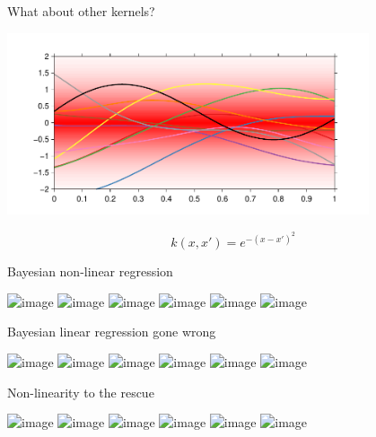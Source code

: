 \begin{frame}{What about other kernels?}
  \begin{center}
    \includegraphics[width=0.8\textwidth]{../figures/lin_reg/sq_exp_prior}
  \end{center}
  \begin{equation*}
    k(x, x') = e^{-(x-x')^2}
  \end{equation*}
\end{frame}

\begin{frame}{Bayesian non-linear regression}
  \begin{center}
    \includegraphics<1>[width=0.8\textwidth]{../figures/lin_reg/sq_exp_1}
    \includegraphics<2>[width=0.8\textwidth]{../figures/lin_reg/sq_exp_2}
    \includegraphics<3>[width=0.8\textwidth]{../figures/lin_reg/sq_exp_3}
    \includegraphics<4>[width=0.8\textwidth]{../figures/lin_reg/sq_exp_5}
    \includegraphics<5>[width=0.8\textwidth]{../figures/lin_reg/sq_exp_10}
    \includegraphics<6>[width=0.8\textwidth]{../figures/lin_reg/sq_exp_15}
  \end{center}
\end{frame}

\begin{frame}{Bayesian linear regression gone wrong}
  \begin{center}
    \includegraphics<1>[width=0.8\textwidth]{../figures/quad/bayes_1}
    \includegraphics<2>[width=0.8\textwidth]{../figures/quad/bayes_2}
    \includegraphics<3>[width=0.8\textwidth]{../figures/quad/bayes_3}
    \includegraphics<4>[width=0.8\textwidth]{../figures/quad/bayes_5}
    \includegraphics<5>[width=0.8\textwidth]{../figures/quad/bayes_10}
    \includegraphics<6>[width=0.8\textwidth]{../figures/quad/bayes_15}
  \end{center}
\end{frame}

\begin{frame}{Non-linearity to the rescue}
  \begin{center}
    \includegraphics<1>[width=0.8\textwidth]{../figures/quad/sq_exp_1}
    \includegraphics<2>[width=0.8\textwidth]{../figures/quad/sq_exp_2}
    \includegraphics<3>[width=0.8\textwidth]{../figures/quad/sq_exp_3}
    \includegraphics<4>[width=0.8\textwidth]{../figures/quad/sq_exp_5}
    \includegraphics<5>[width=0.8\textwidth]{../figures/quad/sq_exp_10}
    \includegraphics<6>[width=0.8\textwidth]{../figures/quad/sq_exp_15}
  \end{center}
\end{frame}

